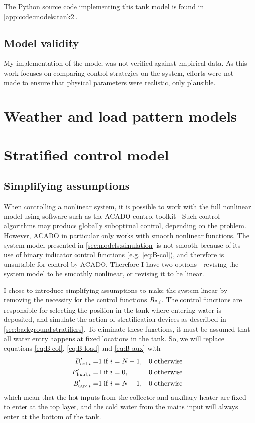 The Python source code implementing this tank model is found in \autoref{app:code:models:tank2}.

\subsection{Model validity}

My implementation of the model was not verified against empirical data.
As this work focuses on comparing control strategies on the system, efforts were not made to ensure that physical parameters were realistic, only plausible.

\section{Weather and load pattern models}
\label{sec:models:disturbances}

\section{Stratified control model}
\label{sec:models:control}

\subsection{Simplifying assumptions}

When controlling a nonlinear system, it is possible to work with the full nonlinear model using software such as the ACADO control toolkit \textcite{ACADO}.
Such control algorithms may produce globally suboptimal control, depending on the problem.
However, ACADO in particular only works with smooth nonlinear functions.
The system model presented in \autoref{sec:models:simulation} is not smooth because of its use of binary indicator control functions (e.g. \autoref{eq:B-col}), and therefore is unsuitable for control by ACADO.
Therefore I have two options - revising the system model to be smoothly nonlinear, or revising it to be linear.

I chose to introduce simplifying assumptions to make the system linear by removing the necessity for the control functions $B_{\text{*}, i}$.
The control functions are responsible for selecting the position in the tank where entering water is deposited, and simulate the action of stratification devices as described in \autoref{sec:background:stratifiers}.
To eliminate these functions, it must be assumed that all water entry happens at fixed locations in the tank.
So, we will replace equations \ref{eq:B-col}, \ref{eq:B-load} and \ref{eq:B-aux} with
\begin{eqnarray}
   \label{eq:B-col'}  B_{\text{col}, i}'  =& 1 \text{ if } i = N-1, & 0 \text{ otherwise} \\
   \label{eq:B-load'} B_{\text{load}, i}' =& 1 \text{ if } i = 0,   & 0 \text{ otherwise} \\
   \label{eq:B-aux'}  B_{\text{aux}, i}'  =& 1 \text{ if } i = N-1, & 0 \text{ otherwise}
\end{eqnarray}
which mean that the hot inputs from the collector and auxiliary heater are fixed to enter at the top layer, and the cold water from the mains input will always enter at the bottom of the tank.

